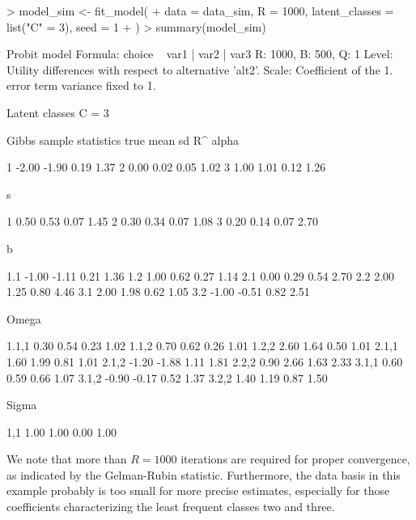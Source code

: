 \documentclass[article,shortnames]{jss}
\begin{document}
\begin{Schunk}
\begin{Sinput}
> model_sim <- fit_model(
+    data = data_sim, R = 1000, latent_classes = list("C" = 3), seed = 1
+  )
> summary(model_sim)
\end{Sinput}
\begin{Soutput}
Probit model
Formula: choice ~ var1 | var2 | var3 
R: 1000, B: 500, Q: 1
Level: Utility differences with respect to alternative 'alt2'.
Scale: Coefficient of the 1. error term variance fixed to 1.

Latent classes
C = 3 

Gibbs sample statistics
          true    mean      sd      R^
 alpha
                                      
     1   -2.00   -1.90    0.19    1.37
     2    0.00    0.02    0.05    1.02
     3    1.00    1.01    0.12    1.26

 s
                                      
     1    0.50    0.53    0.07    1.45
     2    0.30    0.34    0.07    1.08
     3    0.20    0.14    0.07    2.70

 b
                                      
   1.1   -1.00   -1.11    0.21    1.36
   1.2    1.00    0.62    0.27    1.14
   2.1    0.00    0.29    0.54    2.70
   2.2    2.00    1.25    0.80    4.46
   3.1    2.00    1.98    0.62    1.05
   3.2   -1.00   -0.51    0.82    2.51

 Omega
                                      
 1.1,1    0.30    0.54    0.23    1.02
 1.1,2    0.70    0.62    0.26    1.01
 1.2,2    2.60    1.64    0.50    1.01
 2.1,1    1.60    1.99    0.81    1.01
 2.1,2   -1.20   -1.88    1.11    1.81
 2.2,2    0.90    2.66    1.63    2.33
 3.1,1    0.60    0.59    0.66    1.07
 3.1,2   -0.90   -0.17    0.52    1.37
 3.2,2    1.40    1.19    0.87    1.50

 Sigma
                                      
   1,1    1.00    1.00    0.00    1.00
\end{Soutput}
\end{Schunk}

We note that more than $R = 1000$ iterations are required for proper convergence, as indicated by the Gelman-Rubin statistic. Furthermore, the data basis in this example probably is too small for more precise estimates, especially for those coefficients characterizing the least frequent classes two and three.
\end{document}
